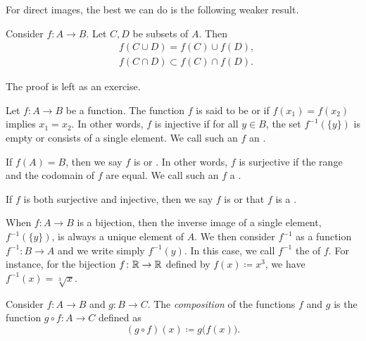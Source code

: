 For direct images, the best we can do is the
following weaker result.

\begin{prop} \label{st:propfor}
Consider $f \colon A \to B$.  Let $C, D$ be subsets of $A$.  Then
\begin{align*}
& f( C \cup D) = f (C) \cup f (D) , \\
& f( C \cap D) \subset f (C) \cap f (D) .
\end{align*}
\end{prop}

The proof is left as an exercise.

\begin{defn}
Let $f \colon A \to B$ be a function.
The function $f$ is said to be
\emph{} or
\emph{} if $f(x_1) = f(x_2)$ implies $x_1 = x_2$.  In
other words,
$f$ is injective if
for all $y \in B$, the set
$f^{-1}(\{y\})$ is empty or consists of a single element.
We call such an $f$ an \emph{}.

If $f(A) = B$, then we say $f$ is
\emph{} or
\emph{}.
In other words, $f$ is surjective if the range and the codomain of $f$ are equal.
We call such an $f$ a \emph{}.

If $f$ is both surjective and injective, then
we say $f$ is \emph{} or that $f$ is a
\emph{}.
\end{defn}

When $f \colon A \to B$ is a bijection, then the inverse image of a single
element, $f^{-1}(\{y\})$, is always
a unique element of $A$.  We then consider $f^{-1}$ as a function
$f^{-1} \colon B \to A$ and we write simply $f^{-1}(y)$.
In this case, we call $f^{-1}$ the \emph{} of $f$.
For instance, for the bijection $f \colon {\mathbb{R}} \to {\mathbb{R}}$ defined by
$f(x) \coloneqq x^3$, we have
$f^{-1}(x) = \sqrt[3]{x}$.


\begin{defn}
Consider $f \colon A \to B$ and $g \colon B \to C$.  The
\emph{composition}
of the functions $f$ and $g$ is the function
$g \circ f \colon A \to C$ defined as
\begin{equation*}
(g \circ f)(x) \coloneqq g\bigl(f(x)\bigr) .
\end{equation*}
\end{defn}

